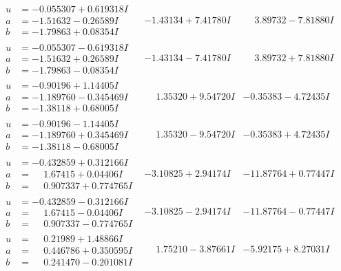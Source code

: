 \documentclass[1p]{elsarticle_modified}
\theoremstyle{definition}
\begin{document}
$$\begin{array}{c|c|c}
\begin{aligned}
u &= -0.055307 + 0.619318 I \\
a &= -1.51632 - 0.26589 I \\
b &= -1.79863 + 0.08354 I\end{aligned}
 & -1.43134 + 7.41780 I & \phantom{-}3.89732 - 7.81880 I \\ \hline\begin{aligned}
u &= -0.055307 - 0.619318 I \\
a &= -1.51632 + 0.26589 I \\
b &= -1.79863 - 0.08354 I\end{aligned}
 & -1.43134 - 7.41780 I & \phantom{-}3.89732 + 7.81880 I \\ \hline\begin{aligned}
u &= -0.90196 + 1.14405 I \\
a &= -1.189760 - 0.345469 I \\
b &= -1.38118 + 0.68005 I\end{aligned}
 & \phantom{-}1.35320 + 9.54720 I & -0.35383 - 4.72435 I \\ \hline\begin{aligned}
u &= -0.90196 - 1.14405 I \\
a &= -1.189760 + 0.345469 I \\
b &= -1.38118 - 0.68005 I\end{aligned}
 & \phantom{-}1.35320 - 9.54720 I & -0.35383 + 4.72435 I \\ \hline\begin{aligned}
u &= -0.432859 + 0.312166 I \\
a &= \phantom{-}1.67415 + 0.04406 I \\
b &= \phantom{-}0.907337 + 0.774765 I\end{aligned}
 & -3.10825 + 2.94174 I & -11.87764 + 0.77447 I \\ \hline\begin{aligned}
u &= -0.432859 - 0.312166 I \\
a &= \phantom{-}1.67415 - 0.04406 I \\
b &= \phantom{-}0.907337 - 0.774765 I\end{aligned}
 & -3.10825 - 2.94174 I & -11.87764 - 0.77447 I \\ \hline\begin{aligned}
u &= \phantom{-}0.21989 + 1.48866 I \\
a &= \phantom{-}0.446786 + 0.350595 I \\
b &= \phantom{-}0.241470 - 0.201081 I\end{aligned}
 & \phantom{-}1.75210 - 3.87661 I & -5.92175 + 8.27031 I \\ \hline\begin{aligned}

\end{aligned}
\end{array}$$
\end{document}
